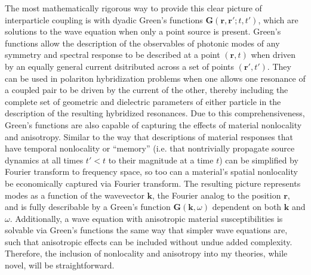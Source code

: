 \documentclass[11pt,a4paper]{article}
\begin{document}
The most mathematically rigorous way to provide this clear picture of interparticle coupling is with dyadic Green's functions $\mathbf{G}(\mathbf{r},\mathbf{r}';t,t')$, which are solutions to the wave equation when only a point source is present. Green's functions allow the description of the observables of photonic modes of any symmetry and spectral response to be described at a point $(\mathbf{r},t)$ when driven by an equally general current dsitributed across a set of points $(\mathbf{r}',t')$. They can be used in polariton hybridization problems when one allows one resonance of a coupled pair to be driven by the current of the other, thereby including the complete set of geometric and dielectric parameters of either particle in the description of the resulting hybridized resonances. Due to this comprehensiveness, Green's functions are also capable of capturing the effects of material nonlocality and anisotropy. Similar to the way that descriptions of material responses that have temporal nonlocality or ``memory'' (i.e. that nontrivially propagate source dynamics at all times $t'<t$ to their magnitude at a time $t$) can be simplified by Fourier transform to frequency space, so too can a material's spatial nonlocality be economically captured via Fourier transform. The resulting picture represents modes as a function of the wavevector $\mathbf{k}$, the Fourier analog to the position $\mathbf{r}$, and is fully describable by a Green's function $\mathbf{G}(\mathbf{k},\omega)$ dependent on both $\mathbf{k}$ and $\omega$. Additionally, a wave equation with anisotropic material susceptibilities is solvable via Green's functions the same way that simpler wave equations are, such that anisotropic effects can be included without undue added complexity. Therefore, the inclusion of nonlocality and anisotropy into my theories, while novel, will be straightforward.
\end{document}
